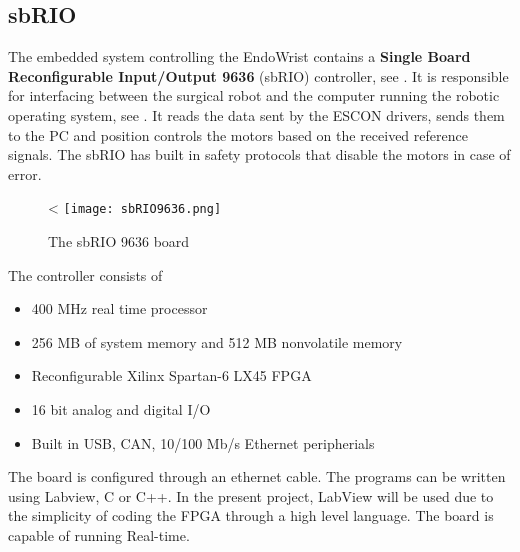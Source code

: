 \subsection{sbRIO}

The embedded system controlling the EndoWrist contains a \textbf{Single Board Reconfigurable Input/Output 9636} (sbRIO) controller, see . It is responsible for interfacing between the surgical robot and the computer running the robotic operating system\cite{Chris_Surgical}, see . It reads the data sent by the ESCON drivers, sends them to the PC and position controls the motors based on the received reference signals. The sbRIO has built in safety protocols that disable the motors in case of error.

\begin{figure}[H]
	\centering
		\centering
<		\texttt{[image: sbRIO9636.png]}
		\caption{The sbRIO 9636 board\cite{sbRIO9636Pic}}
		\label{fig:sbRIO9636}
\end{figure}


The controller consists of
\begin{itemize}
	\item 400 MHz real time processor
	\item 256 MB of system memory and 512 MB nonvolatile memory
	\item Reconfigurable Xilinx Spartan-6 LX45 FPGA
	\item 16 bit analog and digital I/O
	\item Built in USB, CAN, 10/100 Mb/s Ethernet peripherials
\end{itemize}

The board is configured through an ethernet cable. The programs can be written using Labview, C or C++. In the present project, LabView will be used due to the simplicity of coding the FPGA through a high level language. The board is capable of running Real-time. %












